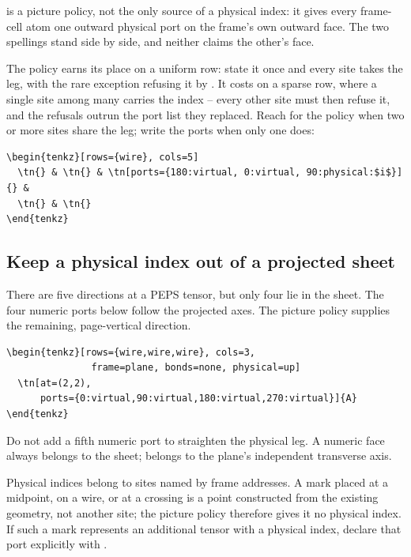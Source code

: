  is a picture policy, not the only source of a physical
index: it gives every frame-cell atom one outward physical port on the
frame's own outward face.  The two spellings stand side by side, and neither
claims the other's face.

The policy earns its place on a uniform row: state it once and every site
takes the leg, with the rare exception refusing it by
.  It costs on a sparse row, where a single site among
many carries the index -- every other site must then refuse it, and the
refusals outrun the port list they replaced.  Reach for the policy when two
or more sites share the leg; write the ports when only one does:

\begin{Verbatim}[fontsize=\small,frame=leftline]
\begin{tenkz}[rows={wire}, cols=5]
  \tn{} & \tn{} & \tn[ports={180:virtual, 0:virtual, 90:physical:$i$}]{} &
  \tn{} & \tn{}
\end{tenkz}
\end{Verbatim}

\subsection{Keep a physical index out of a projected sheet}

There are five directions at a PEPS tensor, but only four lie in the sheet.
The four numeric ports below follow the projected axes.  The picture policy
supplies the remaining, page-vertical direction.

\begin{Verbatim}[fontsize=\small,frame=leftline]
\begin{tenkz}[rows={wire,wire,wire}, cols=3,
               frame=plane, bonds=none, physical=up]
  \tn[at=(2,2),
      ports={0:virtual,90:virtual,180:virtual,270:virtual}]{A}
\end{tenkz}
\end{Verbatim}

Do not add a fifth numeric port to straighten the physical leg.  A numeric
face always belongs to the sheet;  belongs to the plane's
independent transverse axis.

Physical indices belong to sites named by frame addresses.  A mark placed at
a midpoint, on a wire, or at a crossing is a point constructed from the
existing geometry, not another site; the picture policy therefore gives it no
physical index.  If such a mark represents an additional tensor with a
physical index, declare that port explicitly with .

